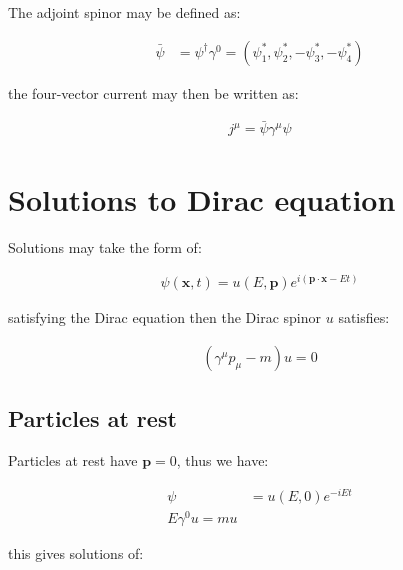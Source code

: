 \documentclass[10pt]{article}
\theoremstyle{definition}
\begin{document}
The adjoint spinor may be defined as:

\begin{align}
    \bar{\psi} &= \psi^{\dagger}\gamma^0 = (\psi_1^*,\psi_2^*,-\psi_3^*,-\psi_4^*)
\end{align}

the four-vector current may then be written as:

\begin{align}
    j^{\mu} = \bar{\psi}\gamma^{\mu}\psi
\end{align}

\section*{Solutions to Dirac equation}

Solutions may take the form of:

\begin{align}
    \psi(\mathbf{x},t) = u(E,\mathbf{p})e^{i(\mathbf{p}\cdot\mathbf{x}-Et)}
\end{align}

satisfying the Dirac  equation then the Dirac spinor $u$ satisfies:

\begin{align}
    (\gamma^{\mu}p_{\mu}-m)u = 0
\end{align}

\subsection*{Particles at rest}%

Particles at rest have $\mathbf{p}=0$, thus we have:

\begin{align}
    \psi &= u(E,0)e^{-iEt}\\
    E\gamma^0u = mu
\end{align}

this gives solutions of:
\end{document}
